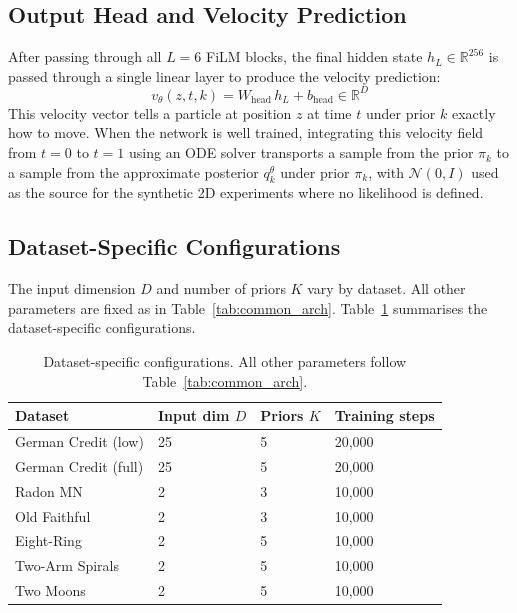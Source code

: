 \subsection{Output Head and Velocity 
Prediction}

After passing through all $L = 6$ FiLM 
blocks, the final hidden state 
$h_L \in \mathbb{R}^{256}$ is passed 
through a single linear layer to 
produce the velocity prediction:
\begin{equation}
    v_\theta(z, t, k) = 
    W_\text{head}\, h_L + b_\text{head} 
    \in \mathbb{R}^D
\end{equation}
This velocity vector tells a particle 
at position $z$ at time $t$ under prior 
$k$ exactly how to move. When the 
network is well trained, integrating 
this velocity field from $t = 0$ to 
$t = 1$ using an ODE solver transports 
a sample from the prior $\pi_k$ to 
a sample from the approximate posterior 
$q^\theta_k$ under prior $\pi_k$, with 
$\mathcal{N}(0, I)$ used as the source 
for the synthetic 2D experiments where 
no likelihood is defined.

\subsection{Dataset-Specific 
Configurations}

The input dimension $D$ and number of 
priors $K$ vary by dataset. All other 
parameters are fixed as in 
Table~\ref{tab:common_arch}. 
Table~\ref{tab:dataset_arch} summarises 
the dataset-specific configurations.

\begin{table}[h]
\centering
\caption{Dataset-specific configurations. 
All other parameters follow 
Table~\ref{tab:common_arch}.}
\label{tab:dataset_arch}
{\singlespacing
\begin{tabular}{llll}
\hline
Dataset & Input dim $D$ & 
Priors $K$ & Training steps \\
\hline
German Credit (low) & 25 & 5 & 20{,}000 \\
German Credit (full) & 25 & 5 & 20{,}000 \\
Radon MN & 2 & 3 & 10{,}000 \\
Old Faithful & 2 & 3 & 10{,}000 \\
Eight-Ring & 2 & 5 & 10{,}000 \\
Two-Arm Spirals & 2 & 5 & 10{,}000 \\
Two Moons & 2 & 5 & 10{,}000 \\
\hline
\end{tabular}}
\end{table}

